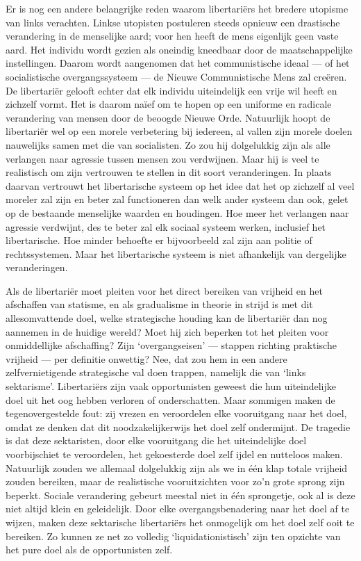 \documentclass[
  a5paper,
  smalldemyvopaper,10pt,twoside,onecolumn,openright,extrafontsizes,hidelinks]{memoir}
\begin{document}
Er is nog een andere belangrijke reden waarom libertariërs het bredere
utopisme van links verachten. Linkse utopisten postuleren steeds opnieuw
een drastische verandering in de menselijke aard; voor hen heeft de mens
eigenlijk geen vaste aard. Het individu wordt gezien als oneindig
kneedbaar door de maatschappelijke instellingen. Daarom wordt aangenomen
dat het communistische ideaal --- of het socialistische overgangssysteem
--- de Nieuwe Communistische Mens zal creëren. De libertariër gelooft
echter dat elk individu uiteindelijk een vrije wil heeft en zichzelf
vormt. Het is daarom naïef om te hopen op een uniforme en radicale
verandering van mensen door de beoogde Nieuwe Orde. Natuurlijk hoopt de
libertariër wel op een morele verbetering bij iedereen, al vallen zijn
morele doelen nauwelijks samen met die van socialisten. Zo zou hij
dolgelukkig zijn als alle verlangen naar agressie tussen mensen zou
verdwijnen. Maar hij is veel te realistisch om zijn vertrouwen te
stellen in dit soort veranderingen. In plaats daarvan vertrouwt het
libertarische systeem op het idee dat het op zichzelf al veel moreler
zal zijn en beter zal functioneren dan welk ander systeem dan ook, gelet
op de bestaande menselijke waarden en houdingen. Hoe meer het verlangen
naar agressie verdwijnt, des te beter zal elk sociaal systeem werken,
inclusief het libertarische. Hoe minder behoefte er bijvoorbeeld zal
zijn aan politie of rechtssystemen. Maar het libertarische systeem is
niet afhankelijk van dergelijke veranderingen.

Als de libertariër moet pleiten voor het direct bereiken van vrijheid en
het afschaffen van statisme, en als gradualisme in theorie in strijd is
met dit allesomvattende doel, welke strategische houding kan de
libertariër dan nog aannemen in de huidige wereld? Moet hij zich
beperken tot het pleiten voor onmiddellijke afschaffing? Zijn
`overgangseisen' --- stappen richting praktische vrijheid --- per
definitie onwettig? Nee, dat zou hem in een andere zelfvernietigende
strategische val doen trappen, namelijk die van `links sektarisme'.
Libertariërs zijn vaak opportunisten geweest die hun uiteindelijke doel
uit het oog hebben verloren of onderschatten. Maar sommigen maken de
tegenovergestelde fout: zij vrezen en veroordelen elke vooruitgang naar
het doel, omdat ze denken dat dit noodzakelijkerwijs het doel zelf
ondermijnt. De tragedie is dat deze sektaristen, door elke vooruitgang
die het uiteindelijke doel voorbijschiet te veroordelen, het gekoesterde
doel zelf ijdel en nutteloos maken. Natuurlijk zouden we allemaal
dolgelukkig zijn als we in één klap totale vrijheid zouden bereiken,
maar de realistische vooruitzichten voor zo'n grote sprong zijn beperkt.
Sociale verandering gebeurt meestal niet in één sprongetje, ook al is
deze niet altijd klein en geleidelijk. Door elke overgangsbenadering
naar het doel af te wijzen, maken deze sektarische libertariërs het
onmogelijk om het doel zelf ooit te bereiken. Zo kunnen ze net zo
volledig `liquidationistisch' zijn ten opzichte van het pure doel als de
opportunisten zelf.
\end{document}
